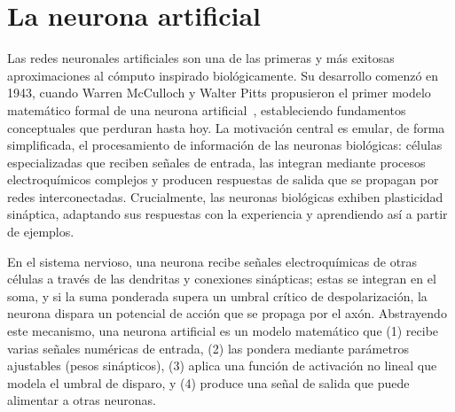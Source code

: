 \section{La neurona artificial}
\label{sec:found:neuron}

Las redes neuronales artificiales son una de las primeras y m\'as exitosas
aproximaciones al c\'omputo inspirado biol\'ogicamente. Su desarrollo comenz\'o en
1943, cuando Warren McCulloch y Walter Pitts propusieron el primer modelo
matem\'atico formal de una neurona artificial~\citep{McCullochPitts1943},
estableciendo fundamentos conceptuales que perduran hasta hoy. La motivaci\'on
central es emular, de forma simplificada, el procesamiento de informaci\'on de las
neuronas biol\'ogicas: c\'elulas especializadas que reciben se\~nales de entrada,
las integran mediante procesos electroqu\'imicos complejos y producen respuestas
de salida que se propagan por redes interconectadas. Crucialmente, las neuronas
biol\'ogicas exhiben plasticidad sin\'aptica, adaptando sus respuestas con la
experiencia y aprendiendo as\'i a partir de ejemplos.

En el sistema nervioso, una neurona recibe se\~nales electroqu\'imicas de otras
c\'elulas a trav\'es de las dendritas y conexiones sin\'apticas; estas se integran
en el soma, y si la suma ponderada supera un umbral cr\'itico de despolarizaci\'on,
la neurona dispara un potencial de acci\'on que se propaga por el ax\'on.
Abstrayendo este mecanismo, una neurona artificial es un modelo matem\'atico que
(1) recibe varias se\~nales num\'ericas de entrada, (2) las pondera mediante
par\'ametros ajustables (pesos sin\'apticos), (3) aplica una funci\'on de
activaci\'on no lineal que modela el umbral de disparo, y (4) produce una se\~nal
de salida que puede alimentar a otras neuronas.

